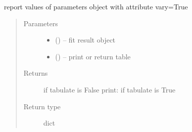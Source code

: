 \documentclass[letterpaper,10pt,english]{sphinxmanual}
\begin{document}
\begin{fulllineitems}
\label{\detokenize{rst/utilities:mstack.utilities.report_refined}}
report values of parameters object with attribute vary=True
\begin{quote}\begin{description}
\item[{Parameters}] \leavevmode\begin{itemize}
\item {} 
 () -- fit result object

\item {} 
 () -- print or return table

\end{itemize}

\item[{Returns}] \leavevmode
if tabulate is False
print: if tabulate is True

\item[{Return type}] \leavevmode
dict

\end{description}\end{quote}

\end{fulllineitems}

\end{document}
